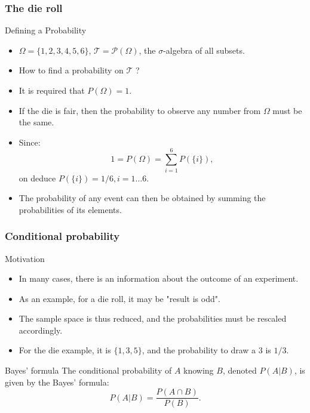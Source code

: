\begin{frame}
    \frametitle{The die roll}
\begin{block}{Defining a Probability}
    \begin{itemize}
        \item<+-> $\Omega = \{1,2,3,4,5,6\}$, $\mathcal{T} = \mathcal{P}\left( \Omega \right)$, 
        the $\sigma$-algebra of all subsets. 
        \item<+-> How to find a probability on $\mathcal{T}$ ?
        \item<+-> It is required that $P\left( \Omega \right) = 1.$
        \item<+-> If the die is fair, then the probability to observe any number
        from $\Omega$ must be the same.
        \item<+-> Since:
        \begin{equation}
            1 = P\left( \Omega \right) = \sum_{i=1}^6 P\left( \{i\} \right),
        \end{equation}
        on deduce $P\left( \{i\} \right) = 1/6, i=1 \dots 6.$
        \item<+-> The probability of any event can then be obtained by summing the probabilities
        of its elements. 
    \end{itemize}
\end{block}
\end{frame}
\begin{frame}
    \frametitle{Conditional probability}
    \begin{block}{Motivation}
    \begin{itemize}
        \item<+-> In many cases, there is an information about the outcome of
        an experiment.
        \item<+-> As an example, for a die roll, it may be "result is odd".
        \item<+-> The sample space is thus reduced, and the probabilities must 
        be rescaled accordingly.
        \item<+-> For the die example, it is $\{1,3,5\}$, and the probability 
        to draw a $3$ is $1/3.$
    \end{itemize}
    \end{block}
    \begin{block}{Bayes' formula}
        The conditional probability of $A$ knowing $B$, denoted $P\left( A \vert B \right)$, is given by the Bayes' formula:
        \begin{equation}
            P\left( A \vert B  \right) = \frac{P\left( A \cap B \right)}{P(B)}.
        \end{equation}
    \end{block}
\end{frame}

